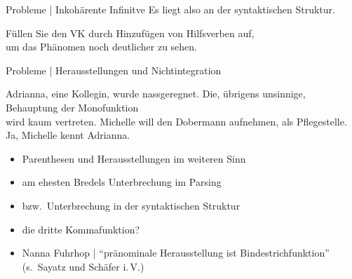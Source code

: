 \begin{frame}
  {Probleme | Inkohärente Infinitve}
  Es liegt also an der syntaktischen Struktur.\\
  \Zeile
  \onslide<+->
  \begin{exe}
    \ex
    \begin{xlist}
        \Viertelzeile
    \end{xlist}
    \Halbzeile
    \ex
    \begin{xlist}
      \Viertelzeile
    \end{xlist}
  \end{exe}
  \Halbzeile
  \onslide<+->
  Füllen Sie den VK durch Hinzufügen von Hilfsverben auf,\\
  um das Phänomen noch deutlicher zu sehen.
\end{frame}

\begin{frame}
  {Probleme | Herausstellungen und Nichtintegration}
  \onslide<+->
  \onslide<+->
  \begin{exe}
    \ex Adrianna, \alert{eine Kollegin}, wurde nassgeregnet.
    \ex Die, \alert{übrigens unsinnige}, Behauptung der Monofunktion\\
    wird kaum vertreten.
    \ex Michelle will den Dobermann aufnehmen, \alert{als Pflegestelle}.
    \ex \alert{Ja}, Michelle kennt Adrianna.
  \end{exe}
  \onslide<+->
  \Halbzeile
  \begin{itemize}[<+->]
    \item \alert{Parenthesen} und \alert{Herausstellungen} im weiteren Sinn
    \item am ehesten Bredels Unterbrechung im Parsing
    \item bzw.\ \alert{Unterbrechung in der syntaktischen Struktur}
    \item die \alert{dritte Kommafunktion}?
      \Halbzeile
    \item Nanna Fuhrhop | "`pränominale Herausstellung ist Bindestrichfunktion"'\\
       (s.\ Sayatz und Schäfer i.\,V.)
  \end{itemize}
\end{frame}

